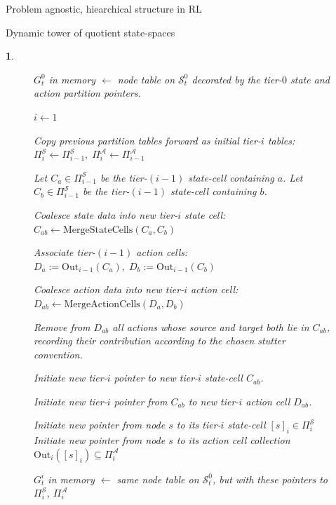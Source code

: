 \documentclass[11pt]{article}
\newtheorem{ermark}[subsubsection]{}
\begin{document}
\begin{section}{Problem agnostic, hiearchical structure in RL}
\begin{subsection}{Dynamic tower of quotient state-spaces}
\begin{ermark}
\begin{figure}[!h]
\begin{algorithm}[H]
\begin{algorithmic}[1]
    \State $G_t^0$ in memory $\gets$ node table on $\mathcal{S}_t^0$ decorated by the tier-$0$ state and action partition pointers.

    \State $i \gets 1$
     \label{line:main-while-loop-algo-init}

        \State Copy previous partition tables forward as initial tier-$i$ tables:
        $
        \Pi_i^{\mathcal S}\gets \Pi_{i-1}^{\mathcal S},
        \;
        \Pi_i^{\mathcal A}\gets \Pi_{i-1}^{\mathcal A}
        $

            \State Let $C_a\in\Pi_{i-1}^{\mathcal S}$ be the tier-$(i-1)$ state-cell containing $a$.
            \State Let $C_b\in\Pi_{i-1}^{\mathcal S}$ be the tier-$(i-1)$ state-cell containing $b$.

                \State Coalesce state data into new tier-$i$ state cell:
                $
                C_{ab}\gets \mathrm{MergeStateCells}(C_a,C_b)
                $

                \State  Associate tier-$(i-1)$ action cells: $D_a:=\mathrm{Out}_{i-1}(C_a),\;D_b:=\mathrm{Out}_{i-1}(C_b)$

                \State Coalesce action data into new tier-$i$ action cell:
                $
                D_{ab}\gets \mathrm{MergeActionCells}(D_a,D_b)
                $
                
                \State Remove from $D_{ab}$ all actions whose source and target both lie in $C_{ab}$, recording their contribution according to the chosen stutter convention.

                \State Initiate new tier-$i$ pointer to new tier-$i$ state-cell $C_{ab}$.

                \State Initiate new tier-$i$ pointer from $C_{ab}$ to new tier-$i$ action cell $D_{ab}$.
                \EndFor
            \EndIf
        \EndFor

         \label{line:last-loop-algo-init}
            \State Initiate new pointer from node $s$  to its tier-$i$ state-cell $[s]_i\in\Pi_i^{\mathcal S}$ 
            \State Initiate new pointer from node $s$  to its action cell collection $\mathrm{Out}_i([s]_i)\subseteq\Pi_i^{\mathcal A}$
        \EndFor

        \State $G_t^i$ in memory $\gets$ same node table on $\mathcal{S}_t^0$, but with these pointers to $\Pi_i^{\mathcal S}$, $\Pi_i^{\mathcal A}$


\end{algorithmic}
\end{algorithm}
\end{figure}
\end{ermark}
\end{subsection}
\end{section}
\end{document}
